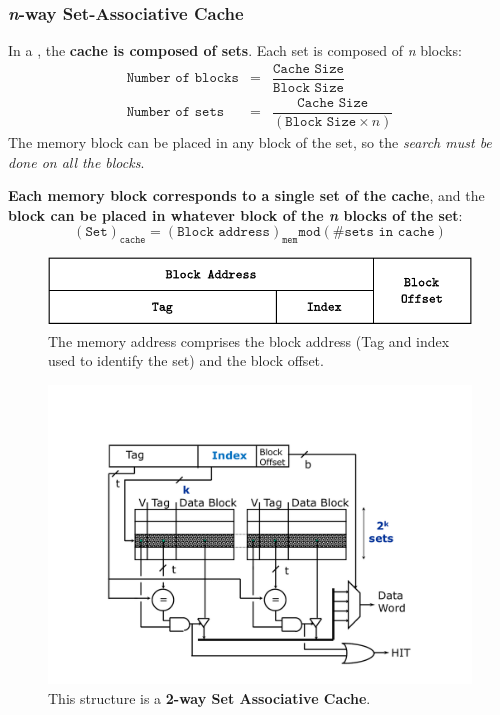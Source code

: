 \newpage

\subsubsection*{\textcolor{Red2}{\emph{n}-way Set-Associative Cache}}\label{n-way Set-Associative Cache}

In a , the \textbf{cache is composed of sets}. Each set is composed of \emph{n} blocks:
\begin{equation}
    \begin{array}{rcl}
        \texttt{Number of blocks} &=& \dfrac{\texttt{Cache Size}}{\texttt{Block Size}} \\ [1.5em]
        \texttt{Number of sets} &=& \dfrac{\texttt{Cache Size}}{\left(\texttt{Block Size} \times n\right)}
    \end{array}
\end{equation}
The memory block can be placed in any block of the set, so the \emph{search must be done on all the blocks}.

\highspace
\textbf{Each memory block corresponds to a single set of the cache}, and the \textbf{block can be placed in whatever block of the \emph{n} blocks of the set}:
\begin{equation}\label{eq: set cache}
    \left(\texttt{Set}\right)_{\texttt{cache}} = \left(\texttt{Block address}\right)_{\texttt{mem}} \texttt{mod} \left(\texttt{\# sets in cache}\right)
\end{equation}

\begin{figure}[!htp]
    \centering
    \includegraphics[width=\textwidth]{img/direct-mapped-cache-1.pdf}
    \caption{The memory address comprises the block address (Tag and index used to identify the set) and the block offset.}
\end{figure}

\begin{figure}[!htp]
    \centering
    \includegraphics[width=.7\textwidth]{img/n-way-set-associative-cache-1.pdf}
    \caption{This structure is a \textbf{2-way Set Associative Cache}.}
\end{figure}

